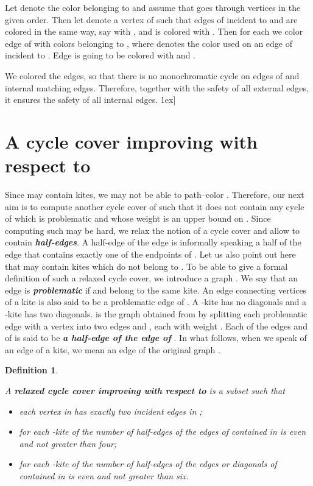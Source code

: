 \documentclass[a4, 11pt]{article}
\newcommand{\koniec}{\hfill \.1ex]}
\newcommand{\<}{\langle}
\renewcommand{\>}{\rangle}
\newtheorem{definition}{Definition}
\begin{document}
Let  denote the color belonging to   and assume that  goes through vertices  in the given order.
Then let  denote a vertex of  such that edges of  incident to   and  are colored in the same way, say with , and  is colored with . Then for each   we color  edge   of  with colors belonging to 
, where  denotes the color used on an edge of  incident to . Edge  is going to be colored with  and . 

We colored the edges, so that there is no monochromatic cycle on edges of  and internal matching edges. Therefore, together with the safety of all external edges, it ensures the safety of all internal edges. \koniec





\section{A cycle cover improving  with respect to }

Since  may contain kites, we may not be able to path--color . Therefore, our next aim is to compute another cycle cover   of  such that it does not contain any cycle of  which is problematic and whose weight is an upper bound on . Since computing such  may be hard, we relax the notion of a cycle cover and allow  to contain {\bf \em half-edges}. A half-edge of the edge  is informally speaking
a half of the edge  that contains exactly one of the endpoints of . Let us also point out  here that  may contain kites which do not belong to .
To be able to  give a formal definition of such a relaxed cycle cover, we introduce a graph . We say that an edge   is {\bf \em problematic} if  and  belong to the same kite. An edge connecting vertices of a kite   is also said to be a problematic edge of . A -kite has no diagonals  and a -kite has two diagonals.    is the graph obtained from  by splitting each problematic  edge  with a vertex  into two edges 
 and , each with weight .  Each of the edges  and  of  is said to be {\bf \em a half-edge of the edge  of }.  In what follows, when we speak of an edge of a kite, we mean an edge of the original graph .

\begin{definition}\label{relst}

A {\bf \em relaxed cycle cover   improving  with respect to }  is a subset  such that
\begin{itemize}
\item[(i)]
each vertex in  has exactly two incident edges  in ;

\item[(ii)]
for each -kite   of   the number of  half-edges  of  the edges of  contained in    is even  and   not greater than four;
\item[(iii)]
for each -kite   of  the number of half-edges  of  the edges  or diagonals of   contained in  is even  and not greater than six.
\end{itemize}
\end{definition}
\end{document}

